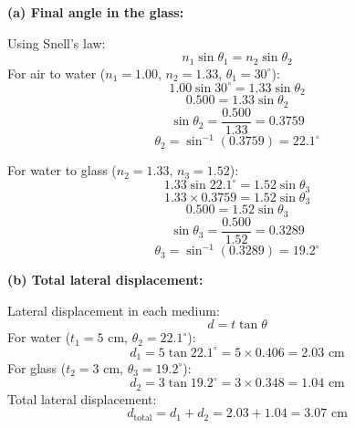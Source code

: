 \documentclass[addpoints]{exam}
\begin{document}
\begin{questions}
\begin{solution} [8cm]

\textbf{(a) Final angle in the glass:}  

Using Snell’s law:  
\[
n_1 \sin \theta_1 = n_2 \sin \theta_2
\]
For air to water (\( n_1 = 1.00 \), \( n_2 = 1.33 \), \( \theta_1 = 30^\circ \)):  
\[
1.00 \sin 30^\circ = 1.33 \sin \theta_2
\]
\[
0.500 = 1.33 \sin \theta_2
\]
\[
\sin \theta_2 = \frac{0.500}{1.33} = 0.3759
\]
\[
\theta_2 = \sin^{-1}(0.3759) = 22.1^\circ
\]

For water to glass (\( n_2 = 1.33 \), \( n_3 = 1.52 \)):  
\[
1.33 \sin 22.1^\circ = 1.52 \sin \theta_3
\]
\[
1.33 \times 0.3759 = 1.52 \sin \theta_3
\]
\[
0.500 = 1.52 \sin \theta_3
\]
\[
\sin \theta_3 = \frac{0.500}{1.52} = 0.3289
\]
\[
\theta_3 = \sin^{-1}(0.3289) = 19.2^\circ
\]

\textbf{(b) Total lateral displacement:}  

Lateral displacement in each medium:  
\[
d = t \tan \theta
\]
For water (\( t_1 = 5 \) cm, \( \theta_2 = 22.1^\circ \)):  
\[
d_1 = 5 \tan 22.1^\circ = 5 \times 0.406 = 2.03 \text{ cm}
\]
For glass (\( t_2 = 3 \) cm, \( \theta_3 = 19.2^\circ \)):  
\[
d_2 = 3 \tan 19.2^\circ = 3 \times 0.348 = 1.04 \text{ cm}
\]
Total lateral displacement:  
\[
d_{\text{total}} = d_1 + d_2 = 2.03 + 1.04 = 3.07 \text{ cm}
\]
\end{solution}


\end{questions}
\end{document}
